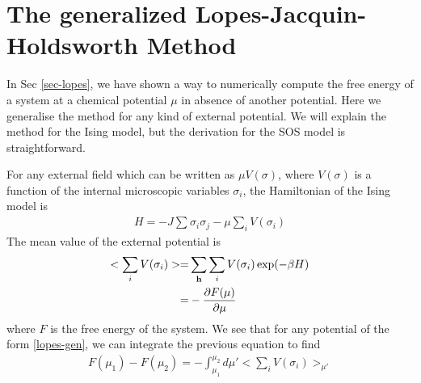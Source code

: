 \section{The generalized Lopes-Jacquin-Holdsworth Method}
\label{gen-lopes}

In Sec \ref{sec-lopes}, we have shown a way to numerically compute the free energy of a system at a chemical potential $\mu$ in absence of another potential. Here we generalise the method for any kind of external potential. We will explain the method for the Ising model, but the derivation for the SOS model is straightforward.

For any external field which can be written as $\mu V(\sigma)$, where $V(\sigma)$ is a function of the internal microscopic variables $\sigma_i$,  the Hamiltonian of the Ising model is
\begin{align}
H = - J \sum_{} \sigma_i \sigma_j - \mu \sum_i V(\sigma_i)
\end{align}
The mean value of the external potential is
\begin{align}
    <  \sum_i V(\sigma_i) > =&  \sum_{\bf h} \sum_i V(\sigma_i) \exp(-\beta H) \nonumber \\
    =&  - \frac{\partial F(\mu)}{\partial \mu}
\end{align}
where $F$ is the free energy of the system. We see that for any potential of the form \eqref{lopes-gen}, we can integrate the previous equation to find
\begin{align}
   F(\mu_1) - F(\mu_2) = - \int_{\mu_1}^{\mu_2} d\mu'  < \sum_i V(\sigma_i) >_{\mu'} 
   \label{lopes-gen}
\end{align}

